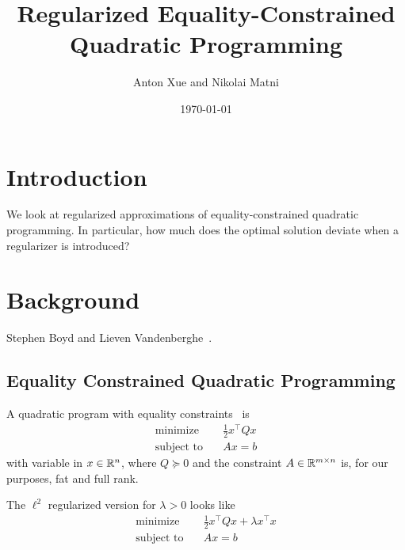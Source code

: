 \documentclass[12pt]{article}
\title{Regularized Equality-Constrained Quadratic Programming}
\author{Anton Xue and Nikolai Matni}
\date{\today}
\date{}
\begin{document}
\maketitle

\section{Introduction}
We look at regularized approximations
of equality-constrained quadratic programming.
In particular, how much does the optimal solution deviate
when a regularizer is introduced?


\section{Background}
Stephen Boyd and Lieven Vandenberghe~\cite{boyd2004convex}.

\subsection{Equality Constrained Quadratic Programming}

A quadratic program with equality constraints~\cite{boyd2004convex} is
\begin{align}
  \text{minimize} &\quad \frac{1}{2} x^\top Q x
    \label{eqn:qp} \\
  \text{subject to} &\quad Ax = b
\end{align}
with variable in \(x \in {\mathbb{R}}^n\),
where \(Q \succeq 0\) and the constraint \(A \in {\mathbb{R}}^{m \times n}\) is,
for our purposes, fat and full rank.

The \(\ell^2\) regularized version for \(\lambda > 0\) looks like
\begin{align}
  \text{minimize} &\quad \frac{1}{2} x^\top Q x + \lambda x^\top x
    \label{eqn:reg-qp} \\
  \text{subject to} &\quad Ax = b
\end{align}
\end{document}
